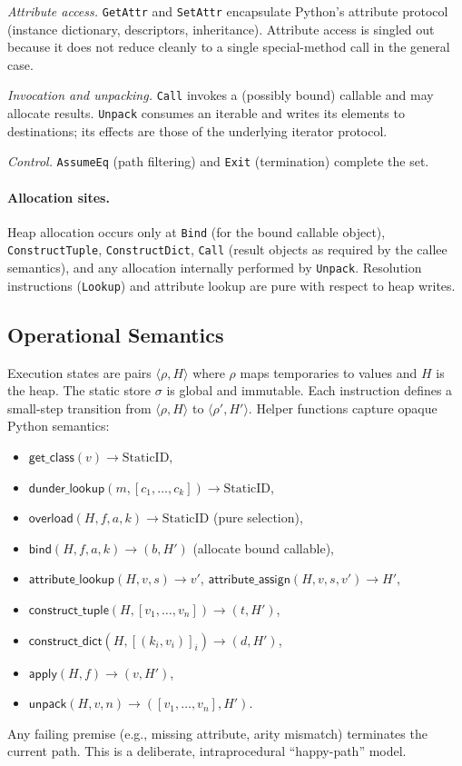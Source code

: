 \smallskip
\noindent\emph{Attribute access.}
\texttt{GetAttr} and \texttt{SetAttr} encapsulate Python’s attribute protocol (instance dictionary, descriptors, inheritance). Attribute access is singled out because it does not reduce cleanly to a single special-method call in the general case.

\smallskip
\noindent\emph{Invocation and unpacking.}
\texttt{Call} invokes a (possibly bound) callable and may allocate results. \texttt{Unpack} consumes an iterable and writes its elements to destinations; its effects are those of the underlying iterator protocol.

\smallskip
\noindent\emph{Control.}
\texttt{AssumeEq} (path filtering) and \texttt{Exit} (termination) complete the set.

\paragraph{Allocation sites.}
Heap allocation occurs only at \texttt{Bind} (for the bound callable object), \texttt{ConstructTuple}, \texttt{ConstructDict}, \texttt{Call} (result objects as required by the callee semantics), and any allocation internally performed by \texttt{Unpack}. Resolution instructions (\texttt{Lookup\*}) and attribute lookup are pure with respect to heap writes.

\subsection{Operational Semantics}

Execution states are pairs $\langle \rho, H \rangle$ where $\rho$ maps temporaries to values and $H$ is the heap. The static store $\sigma$ is global and immutable. Each instruction defines a small-step transition from $\langle \rho, H \rangle$ to $\langle \rho', H' \rangle$. Helper functions capture opaque Python semantics:
\begin{itemize}
\item $\mathsf{get\_class}(v) \to \text{StaticID}$,
\item $\mathsf{dunder\_lookup}(m, [c_1,\ldots,c_k]) \to \text{StaticID}$,
\item $\mathsf{overload}(H, f, a, k) \to \text{StaticID}$ (pure selection),
\item $\mathsf{bind}(H, f, a, k) \to (b, H')$ (allocate bound callable),
\item $\mathsf{attribute\_lookup}(H, v, s) \to v'$, $\mathsf{attribute\_assign}(H, v, s, v') \to H'$,
\item $\mathsf{construct\_tuple}(H, [v_1,\ldots,v_n]) \to (t, H')$,
\item $\mathsf{construct\_dict}(H, [(k_i,v_i)]_i) \to (d, H')$,
\item $\mathsf{apply}(H, f) \to (v, H')$,
\item $\mathsf{unpack}(H, v, n) \to ([v_1,\ldots,v_n], H')$.
\end{itemize}
Any failing premise (e.g., missing attribute, arity mismatch) terminates the current path. This is a deliberate, intraprocedural ``happy-path'' model.

